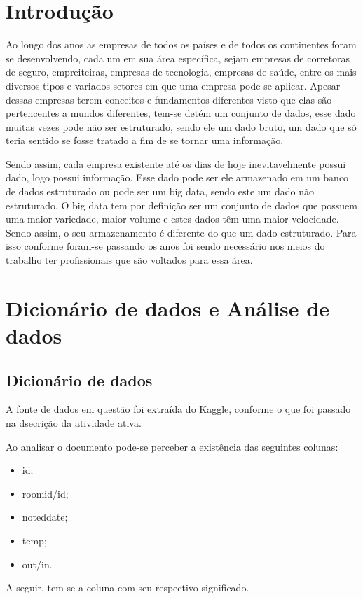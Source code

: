 \documentclass[a4paper, 12pt]{article}
\begin{document}
\newpage
{}
\section{Introdução}

Ao longo dos anos as empresas de todos os países e de todos os continentes foram se desenvolvendo, cada um em sua área específica, sejam empresas de corretoras de seguro, empreiteiras, empresas de tecnologia, empresas de saúde, entre os mais diversos tipos e variados setores em que uma empresa pode se aplicar. Apesar dessas empresas terem conceitos e fundamentos diferentes visto que elas são pertencentes a mundos diferentes, tem-se detém um conjunto de dados, esse dado muitas vezes pode não ser estruturado, sendo ele um dado bruto, um dado que só teria sentido se fosse tratado a fim de se tornar uma informação.

Sendo assim, cada empresa existente até os dias de hoje inevitavelmente possui dado, logo possui informação. Esse dado pode ser ele armazenado em um banco de dados estruturado ou pode ser um big data, sendo este um dado não estruturado.
O big data tem por definição ser um conjunto de dados que possuem uma maior variedade, maior volume e estes dados têm uma maior velocidade. Sendo assim, o seu armazenamento é diferente do que um dado estruturado. Para isso conforme foram-se passando os anos foi sendo necessário nos meios do trabalho ter profissionais que são voltados para essa área.

\newpage
\section{Dicionário de dados e Análise de dados}
\subsection{Dicionário de dados}
A fonte de dados em questão foi extraída do Kaggle, conforme o que foi passado na dsecrição da atividade ativa.

Ao analisar o documento pode-se perceber a existência das seguintes colunas:
\begin{itemize}
    \item id;
    \item roomid/id;
    \item noteddate;
    \item temp;
    \item out/in.
\end{itemize}
A seguir, tem-se a coluna com seu respectivo significado.
\end{document}
